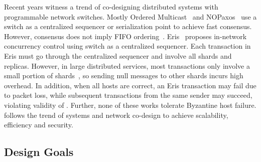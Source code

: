 Recent years witness a trend of co-designing distributed systems with programmable network switches.
Mostly Ordered Multicast~\cite{ports2015designing} and NOPaxos~\cite{li2016just} use a switch as a centralized sequencer or serialization point to achieve fast consensus.
However, consensus does not imply FIFO ordering~\cite{junqueira2011zab}.
Eris~\cite{eris} proposes in-network concurrency control using switch as a centralized sequencer.
Each transaction in Eris must go through the centralized sequencer and involve all shards and replicas.
However, in large distributed services, most transactions only involve a small portion of shards~\cite{nishtala2013scaling}, so sending null messages to other shards incurs high overhead.
In addition, when all hosts are correct, an Eris transaction may fail due to packet loss, while subsequent transactions from the same sender may succeed, violating validity of \sys.
Further, none of these works tolerate Byzantine host failure.
\sys follows the trend of systems and network co-design to achieve scalability, efficiency and security.

\fi




\iffalse
\subsection{Design Goals}
\label{sec:goals}

